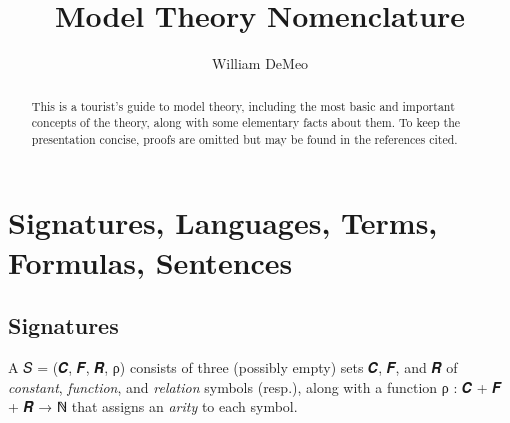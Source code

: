 \documentclass[a4paper,UKenglish,cleveref,autoref,thm-restate,12pt]{lipics-v2021-wjd}
\title{Model Theory Nomenclature}%
\author{William DeMeo}
       {Department of Algebra, Charles University in Prague \and \url{https://williamdemeo.gitlab.io}}
       {williamdemeo@gmail.com}{https://orcid.org/0000-0003-1832-5690}{}
\newcommand{\<}{\langle}
\renewcommand{\>}{\rangle}
\begin{document}
\maketitle

\begin{abstract}

This is a tourist's guide to model theory, including the most basic and
important concepts of the theory, along with some elementary facts about them.
To keep the presentation concise, proofs are omitted but may be found in the
references cited.
\end{abstract}

\section{Signatures, Languages, Terms, Formulas, Sentences}\label{signatures-languages-terms-formulas-sentences}

\subsection{Signatures}\label{signatures}

A  𝑆 = (𝑪, 𝑭, 𝑹, ρ) consists of three (possibly empty) sets 𝑪, 𝑭, and 𝑹 of \emph{constant},
\emph{function}, and \emph{relation} symbols (resp.), along with a function
ρ : 𝑪 + 𝑭 + 𝑹 → ℕ that assigns an \emph{arity} to each symbol.
\end{document}
